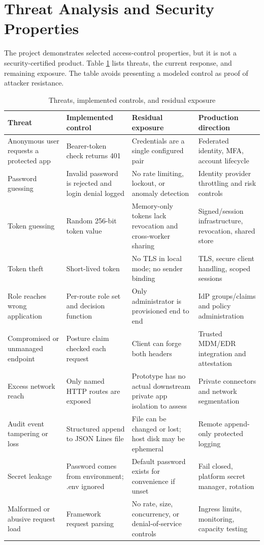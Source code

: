 \section{Threat Analysis and Security Properties}
The project demonstrates selected access-control properties, but it is not a security-certified product. Table \ref{tab:threats} lists threats, the current response, and remaining exposure. The table avoids presenting a modeled control as proof of attacker resistance.
\begin{table}[t]
\caption{Threats, implemented controls, and residual exposure}
\label{tab:threats}
\centering
\begin{tabular}{p{}p{}p{}p{}}
\toprule
Threat & Implemented control & Residual exposure & Production direction\\
\midrule
Anonymous user requests a protected app & Bearer-token check returns 401 & Credentials are a single configured pair & Federated identity, MFA, account lifecycle\\
Password guessing & Invalid password is rejected and login denial logged & No rate limiting, lockout, or anomaly detection & Identity provider throttling and risk controls\\
Token guessing & Random 256-bit token value & Memory-only tokens lack revocation and cross-worker sharing & Signed/session infrastructure, revocation, shared store\\
Token theft & Short-lived token & No TLS in local mode; no sender binding & TLS, secure client handling, scoped sessions\\
Role reaches wrong application & Per-route role set and decision function & Only administrator is provisioned end to end & IdP groups/claims and policy administration\\
Compromised or unmanaged endpoint & Posture claim checked each request & Client can forge both headers & Trusted MDM/EDR integration and attestation\\
Excess network reach & Only named HTTP routes are exposed & Prototype has no actual downstream private app isolation to assess & Private connectors and network segmentation\\
Audit event tampering or loss & Structured append to JSON Lines file & File can be changed or lost; host disk may be ephemeral & Remote append-only protected logging\\
Secret leakage & Password comes from environment; .env ignored & Default password exists for convenience if unset & Fail closed, platform secret manager, rotation\\
Malformed or abusive request load & Framework request parsing & No rate, size, concurrency, or denial-of-service controls & Ingress limits, monitoring, capacity testing\\
\bottomrule
\end{tabular}
\end{table}

